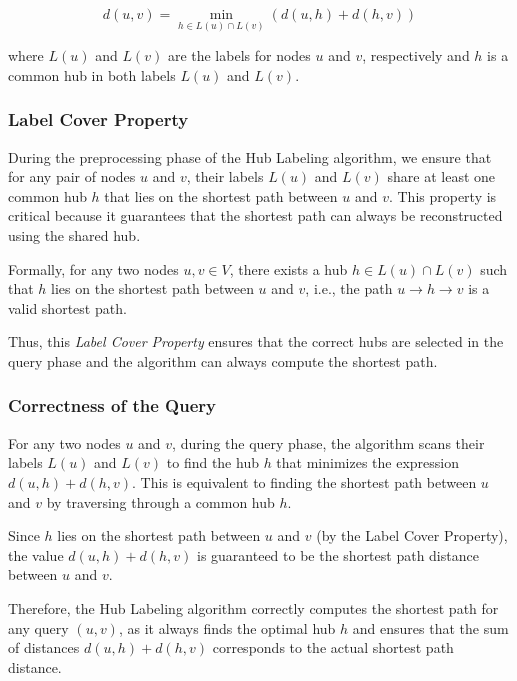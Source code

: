 \begin{appendices}
	\begin{equation}
		d(u, v) = \min_{h \in \textit{L}(u) \cap \textit{L}(v)} \left( d(u, h) + d(h, v) \right)
	\end{equation}
	
	where $ L(u) $ and $ L(v) $ are the labels for nodes $ u $ and $ v $, respectively and $ h $ is a common hub in both labels $ L(u) $ and $ L(v) $.
	
	\subsubsection{Label Cover Property}
	
	During the preprocessing phase of the Hub Labeling algorithm, we ensure that for any pair of nodes $ u $ and $ v $, their labels $ L(u) $ and $ L(v) $ share at least one common hub $ h $ that lies on the shortest path between $ u $ and $ v $. This property is critical because it guarantees that the shortest path can always be reconstructed using the shared hub. \medskip
	
	Formally, for any two nodes $ u, v \in V $, there exists a hub $ h \in L(u) \cap L(v) $ such that $ h $ lies on the shortest path between $ u $ and $ v $, i.e., the path $ u \to h \to v $ is a valid shortest path. \medskip
	
	Thus, this \textit{Label Cover Property} ensures that the correct hubs are selected in the query phase and the algorithm can always compute the shortest path.
	
	\subsubsection{Correctness of the Query}
	
	For any two nodes $ u $ and $ v $, during the query phase, the algorithm scans their labels $ L(u) $ and  $ L(v) $ to find the hub $ h $ that minimizes the expression $ d(u, h) + d(h, v) $. This is equivalent to finding the shortest path between $ u $  and $ v $ by traversing through a common hub $ h $. \medskip
	
	Since $ h $ lies on the shortest path between $ u $ and $ v $ (by the Label Cover Property), the value $ d(u, h) + d(h, v) $ is guaranteed to be the shortest path distance between $ u $ and $ v $. \medskip
	
	Therefore, the Hub Labeling algorithm correctly computes the shortest path for any query $ (u, v) $, as it always finds the optimal hub $ h $ and ensures that the sum of distances $ d(u, h) + d(h, v) $ corresponds to the actual shortest path distance.
	

\end{appendices}
